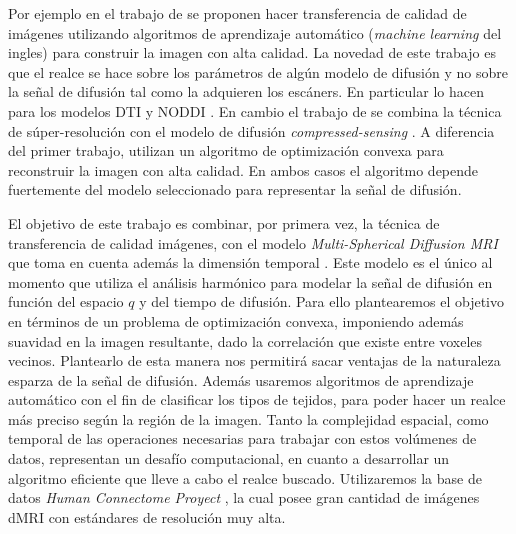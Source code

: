 \documentclass[a4paper,10pt]{article}
\begin{document}
Por ejemplo en el trabajo de \citet{Alexander2014} se proponen hacer transferencia de 
calidad de imágenes utilizando algoritmos de aprendizaje automático 
(\textit{machine learning} del ingles) para construir la imagen con alta 
calidad. 
La novedad de este trabajo es que el realce se hace sobre los parámetros de algún modelo de difusión y no sobre la señal 
de difusión tal como la adquieren los escáners. En particular lo hacen para los modelos DTI y NODDI \citep{Zhang2012}. 
En cambio el trabajo de \citet{Ning2016} se combina la 
t\'ecnica de súper-resolución con el modelo de difusión \textit{compressed-sensing} \citep{Naidoo2015}. A 
diferencia del primer trabajo, utilizan un algoritmo de optimización convexa para reconstruir la imagen con alta 
calidad. En ambos casos el algoritmo depende fuertemente del modelo seleccionado para representar la señal de difusión.

El objetivo de este trabajo es combinar, por primera vez, la técnica de transferencia de calidad 
imágenes, con el 
modelo \textit{Multi-Spherical Diffusion MRI} que toma en cuenta además la dimensión temporal \citep{Fick}. Este modelo 
es el \'unico al momento que utiliza el análisis harmónico para modelar la señal de difusión en función del espacio $q$ 
y del tiempo de difusión. Para ello plantearemos el objetivo en términos de un problema de optimización convexa, 
imponiendo además suavidad en la imagen resultante, dado la correlaci\'on que existe entre voxeles vecinos. Plantearlo 
de esta manera nos permitirá sacar ventajas de la naturaleza esparza de la señal de difusión. Además usaremos 
algoritmos de aprendizaje automático con el fin de clasificar los tipos de tejidos, para poder hacer un realce más 
preciso según la región de la imagen. Tanto la complejidad espacial, como temporal de las operaciones necesarias para 
trabajar con estos vol\'umenes de datos, representan un desafío computacional, en cuanto a desarrollar un algoritmo 
eficiente que lleve a cabo el realce buscado. Utilizaremos la base de datos \textit{Human Connectome Proyect} 
\citep{Sotiropoulos2013125}, la cual posee gran cantidad de imágenes dMRI con estándares de 
resolución muy alta.

\clearpage


\end{document}

